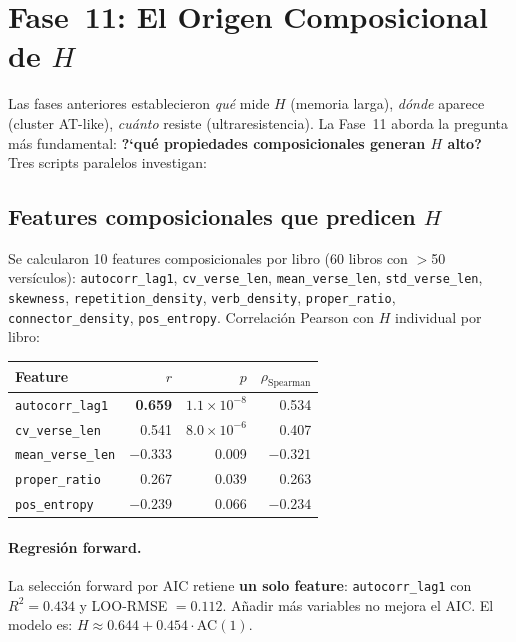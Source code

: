 \documentclass[12pt,a4paper]{article}
\newcommand{\val}[1]{\textcolor{hlcolor}{\textbf{#1}}}
\begin{document}
\section{Fase~11: El Origen Composicional de $H$}

Las fases anteriores establecieron \emph{qu\'e} mide $H$ (memoria larga),
\emph{d\'onde} aparece (cluster AT-like), \emph{cu\'anto} resiste (ultraresistencia).
La Fase~11 aborda la pregunta m\'as fundamental:
\textbf{?`qu\'e propiedades composicionales generan $H$ alto?}
Tres scripts paralelos investigan:

\subsection{Features composicionales que predicen $H$}

Se calcularon 10 features composicionales por libro (60 libros con $>$50 vers\'iculos):
\texttt{autocorr\_lag1}, \texttt{cv\_verse\_len}, \texttt{mean\_verse\_len},
\texttt{std\_verse\_len}, \texttt{skewness}, \texttt{repetition\_density},
\texttt{verb\_density}, \texttt{proper\_ratio}, \texttt{connector\_density},
\texttt{pos\_entropy}. Correlaci\'on Pearson con $H$ individual por libro:

\begin{center}\small
\begin{tabular}{lrrr}
\toprule
Feature & $r$ & $p$ & $\rho_{\text{Spearman}}$ \\
\midrule
\texttt{autocorr\_lag1}   &  \val{0.659} & $1.1 \times 10^{-8}$ & 0.534 \\
\texttt{cv\_verse\_len}   &  0.541 & $8.0 \times 10^{-6}$ & 0.407 \\
\texttt{mean\_verse\_len} & $-0.333$ & 0.009 & $-0.321$ \\
\texttt{proper\_ratio}    &  0.267 & 0.039 & 0.263 \\
\texttt{pos\_entropy}     & $-0.239$ & 0.066 & $-0.234$ \\
\bottomrule
\end{tabular}
\end{center}

\paragraph{Regresi\'on forward.}
La selecci\'on forward por AIC retiene \textbf{un solo feature}:
\texttt{autocorr\_lag1} con $R^2 = 0.434$ y LOO-RMSE $= 0.112$.
A\~nadir m\'as variables no mejora el AIC.
El modelo es: $H \approx 0.644 + 0.454 \cdot \text{AC}(1)$.
\end{document}
